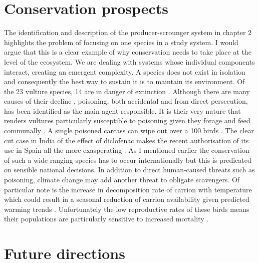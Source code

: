 \section{\uppercase{C}onservation prospects}
  The identification and description of the producer-scrounger system in chapter 2 highlights the problem of focusing on one species in a study system. I would argue that this is a clear example of why conservation needs to take place at the level of the ecosystem. We are dealing with systems whose individual components interact, creating an emergent complexity. A species does not exist in isolation and consequently the best way to sustain it is to maintain its environment. Of the 23 vulture species, 14 are in danger of extinction \citep{ogada2012dropping}. Although there are many causes of their decline \citep{mundy1992vultures}, poisoning, both accidental and from direct persecution, has been identified as the main agent responsible. It is their very nature that renders vultures particularly susceptible to poisoning given they forage and feed communally \citep{ogada2012dropping}. A single poisoned carcass can wipe out over a 100 birds \citep{mundy1992vultures}. The clear cut case in India of the effect of diclofenac makes the recent authorisation of its use in Spain all the more exasperating \citep{COBI:COBI12271}. As I mentioned earlier the conservation of such a wide ranging species has to occur internationally but this is predicated on sensible national decisions. In addition to direct human-caused threats such as poisoning, climate change may add another threat to obligate scavengers. Of particular note is the increase in decomposition rate of carrion with temperature which could result in a seasonal reduction of carrion availability given predicted warming trends \citep{moleon2014inter}. Unfortunately the low reproductive rates of these birds means their populations are particularly sensitive to increased mortality \citep{ogada2012dropping}. 

\section{\uppercase{F}uture directions}

